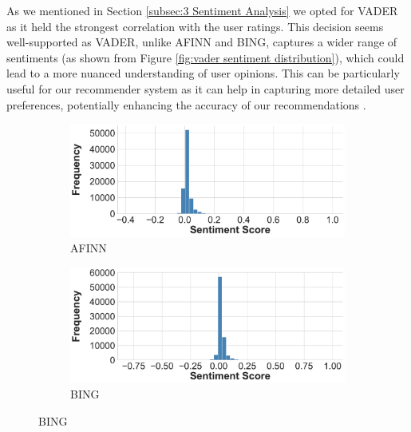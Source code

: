 As we mentioned in Section \ref{subsec:3 Sentiment Analysis} we opted for VADER as it held the strongest correlation with the user ratings. This decision seems well-supported as VADER, unlike AFINN and BING, captures a wider range of sentiments (as shown from Figure \ref{fig:vader sentiment distribution}), which could lead to a more nuanced understanding of user opinions. This can be particularly useful for our recommender system as it can help in capturing more detailed user preferences, potentially enhancing the accuracy of our recommendations \cite{dang2021approach}. 

\begin{figure}[h]
  \centering
  \begin{subfigure}{0.49\textwidth} %
      \includegraphics[width=\textwidth]{Figures/distribution_afinn.pdf} %
      \caption{AFINN}
      \label{fig:afinn sentiment distribution}
  \end{subfigure}
  \hfill
  \begin{subfigure}{0.49\textwidth} %
      \includegraphics[width=\textwidth]{Figures/distribution_bing.pdf} %
      \caption{BING} %
      \label{fig:bing sentiment distribution} %
  \end{subfigure}

\end{figure}
